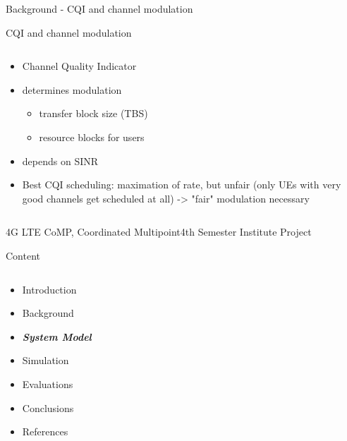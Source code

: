 \documentclass[xcolor={cmyk}]{beamer}
\begin{document}
 \begin{frame}{Background - CQI and channel modulation}
 	\begin{block}{CQI and channel modulation}
		\begin{columns}
			\begin{column}{.9\textwidth}
				\begin{itemize}
					\item Channel Quality Indicator
					\item determines modulation
					\begin{itemize}
						\item transfer block size (TBS)
						\item resource blocks for users
					\end{itemize}
					\item depends on SINR
					\item Best CQI scheduling: maximation of rate, but unfair (only UEs with very good channels get scheduled at all) -> "fair" modulation necessary
				\end{itemize}
			\end{column}
		\end{columns}
	 \end{block}
 \end{frame}

\begin{frame}{4G LTE CoMP, Coordinated Multipoint}{4th Semester Institute Project}
	\begin{block}{Content}
		\begin{columns}
			\begin{column}{.9\textwidth}
				\begin{itemize}
					\item Introduction
					\item Background
					\item \textbf{\emph{System Model}}
					\item Simulation
					\item Evaluations
					\item Conclusions
					\item References
				\end{itemize}
			\end{column}
		\end{columns}
	\end{block}
\end{frame}
\end{document}
